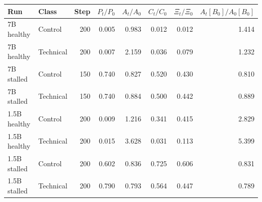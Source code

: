 \begin{tabular}{llrrrrrr}
\toprule
Run & Class & Step & $P_t/P_0$ & $A_t/A_0$ & $C_t/C_0$ & $\Xi_t/\Xi_0$ & $A_t[B_0]/A_0[B_0]$ \\
\midrule
7B healthy & Control & 200 & 0.005 & 0.983 & 0.012 & 0.012 & 1.414 \\
7B healthy & Technical & 200 & 0.007 & 2.159 & 0.036 & 0.079 & 1.232 \\
7B stalled & Control & 150 & 0.740 & 0.827 & 0.520 & 0.430 & 0.810 \\
7B stalled & Technical & 150 & 0.740 & 0.884 & 0.500 & 0.442 & 0.889 \\
1.5B healthy & Control & 200 & 0.009 & 1.216 & 0.341 & 0.415 & 2.829 \\
1.5B healthy & Technical & 200 & 0.015 & 3.628 & 0.031 & 0.113 & 5.399 \\
1.5B stalled & Control & 200 & 0.602 & 0.836 & 0.725 & 0.606 & 0.831 \\
1.5B stalled & Technical & 200 & 0.790 & 0.793 & 0.564 & 0.447 & 0.789 \\
\bottomrule
\end{tabular}
